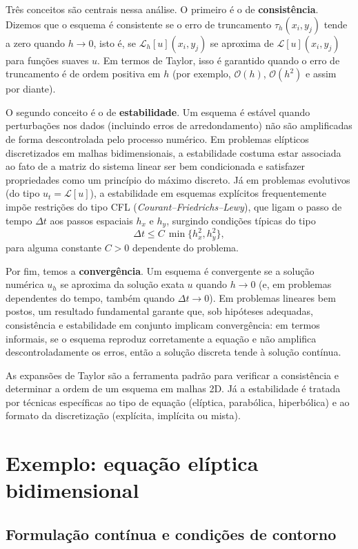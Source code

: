 Três conceitos são centrais nessa análise. O primeiro é o de \textbf{consistência}. 
Dizemos que o esquema é consistente se o erro de truncamento $\tau_h(x_i,y_j)$ 
tende a zero quando $h \to 0$, isto é, se $\mathcal{L}_h[u](x_i,y_j)$ se aproxima 
de $\mathcal{L}[u](x_i,y_j)$ para funções suaves $u$. Em termos de Taylor, isso 
é garantido quando o erro de truncamento é de ordem positiva em $h$ (por exemplo, 
$\mathcal{O}(h)$, $\mathcal{O}(h^2)$ e assim por diante).

O segundo conceito é o de \textbf{estabilidade}. Um esquema é estável quando 
perturbações nos dados (incluindo erros de arredondamento) não são amplificadas 
de forma descontrolada pelo processo numérico. Em problemas elípticos 
discretizados em malhas bidimensionais, a estabilidade costuma estar associada 
ao fato de a matriz do sistema linear ser bem condicionada e satisfazer 
propriedades como um princípio do máximo discreto. Já em problemas evolutivos 
(do tipo $u_t = \mathcal{L}[u]$), a estabilidade em esquemas explícitos 
frequentemente impõe restrições do tipo CFL (\emph{Courant--Friedrichs--Lewy}), 
que ligam o passo de tempo $\Delta t$ aos passos espaciais $h_x$ e $h_y$, 
surgindo condições típicas do tipo
\[
   \Delta t \le C \,\min\{h_x^2,h_y^2\},
\]
para alguma constante $C>0$ dependente do problema.

Por fim, temos a \textbf{convergência}. Um esquema é convergente se a solução 
numérica $u_h$ se aproxima da solução exata $u$ quando $h \to 0$ (e, em problemas 
dependentes do tempo, também quando $\Delta t \to 0$). Em problemas lineares bem 
postos, um resultado fundamental garante que, sob hipóteses adequadas, 
consistência e estabilidade em conjunto implicam convergência: em termos 
informais, se o esquema reproduz corretamente a equação e não amplifica 
descontroladamente os erros, então a solução discreta tende à solução contínua.

As expansões de Taylor são a ferramenta padrão para verificar a consistência 
e determinar a ordem de um esquema em malhas 2D. Já a estabilidade é tratada 
por técnicas específicas ao tipo de equação (elíptica, parabólica, hiperbólica) 
e ao formato da discretização (explícita, implícita ou mista).

\section{Exemplo: equação elíptica bidimensional}

\subsection{Formulação contínua e condições de contorno}


